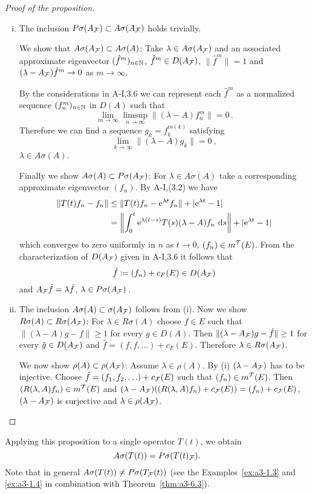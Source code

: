 \begin{proof}[Proof of the proposition]
\begin{enumerate}[(i), wide]
\item 
The inclusion $P\sigma(A_{\mathcal{F}}) \subset A\sigma(A_{\mathcal{F}})$ holds trivially.

We show that $A\sigma(A_{\mathcal{F}}) \subset A\sigma(A)$: Take $\lambda \in A\sigma(A_{\mathcal{F}})$ and an associated approximate eigenvector $({\hat{f}^{m}})_{n \in \mathbb{N}}$, \ie $\hat{f}^{m} \in D(A_{\mathcal{F}})$, $\|\hat{f}^{m}\| = 1$ and $(\lambda-A_{\mathcal{F}})\hat{f}^{m} \to 0$ as $m \to \infty$.

By the considerations in A-I,3.6 we can represent each $\hat{f}^{m}$ as a normalized sequence $(f_{n}^{m})_{n \in \mathbb{N}}$ in $D(A)$ such that
\[
\lim_{m \to \infty} \limsup_{n \to \infty} \|(\lambda-A)f_{n}^{m}\| = 0\,.
\]
Therefore we can find a sequence $g_{k} = f_{k}^{m(k)}$ satisfying
\[
\lim_{k \to \infty} \|(\lambda-A)g_{k}\| = 0\,,
\]
\ie $\lambda \in A\sigma(A)$.

Finally we show $A\sigma(A) \subset P\sigma(A_{\mathcal{F}})$: For $\lambda \in A\sigma(A)$ take a corresponding approximate eigenvector $(f_{n})$.
By A-I,(3.2) we have
\begin{align*}
\|T(t)f_{n} - f_{n}\| &\leq \|T(t)f_{n} - \mathrm{e}^{\lambda t}f_{n}\| + |\mathrm{e}^{\lambda t} - 1| \\
&= \left\|\int_{0}^{t} \mathrm{e}^{\lambda(t-s)}T(s)(\lambda-A)f_{n} \, \mathop{}\!\mathrm{d}{s}\right\| + |\mathrm{e}^{\lambda t} -1|
\end{align*}
which converges to zero uniformly in $n$ as $t \to 0$, \ie $(f_{n}) \in m^{\mathcal{T}}(E)$.
From the characterization of $D(A_{\mathcal{F}})$ given in A-I,3.6 it follows that
\[
\hat{f} \coloneqq (f_{n}) + c_{F}(E) \in D(A_{\mathcal{F}})
\]
and $A_{\mathcal{F}}\hat{f} = \lambda\hat{f}$, \ie $\lambda \in P\sigma(A_{\mathcal{F}})$\,.

\item 
The inclusion $A\sigma(A) \subset \sigma(A_{\mathcal{F}})$ follows from (i). Now we show $R\sigma(A) \subset R\sigma(A_{\mathcal{F}})$:
For $\lambda \in R\sigma(A)$ choose $f \in E$ such that $\|(\lambda-A)g - f\| \geq 1$ for every $g \in D(A)$.
Then $\|(\lambda-A_{\mathcal{F}})g - \hat{f}\| \geq 1$ for every $\hat{g} \in D(A_{\mathcal{F}})$ and $\hat{f} = (f,f,\ldots) + c_{F}(E)$.
Therefore $\lambda \in R\sigma(A_{\mathcal{F}})$.

We now show $\rho(A) \subset \rho(A_{\mathcal{F}})$: Assume $\lambda \in \rho(A)$.
By (i) $(\lambda-A_{\mathcal{F}})$ has to be injective.
Choose $\hat{f} = (f_{1},f_{2},\ldots) + c_{\mathcal{F}}(E)$ such that $(f_{n}) \in m^{\mathcal{T}}(E)$.
Then $(R(\lambda,A)f_{n}) \in m^{\mathcal{T}}(E)$ and $(\lambda-A_{\mathcal{F}})((R(\lambda,A)f_{n})+c_{\mathcal{F}}(E)) = (f_{n}) + c_{\mathcal{F}}(E)$, \ie $(\lambda-A_{\mathcal{F}})$ is surjective and $\lambda \in \rho(A_{\mathcal{F}})$.
\end{enumerate}
\end{proof}
Applying this proposition to a single operator $T(t)$, we obtain
\[
A\sigma(T(t)) = P\sigma(T(t)_{\mathcal{F}}) .
\]
Note that in general $A\sigma(T(t)) \neq P\sigma(T_{\mathcal{F}}(t))$ (see the Examples~\ref{ex:a3-1.3} and \ref{ex:a3-1.4} in combination with Theorem~\ref{thm:a3-6.3}).

